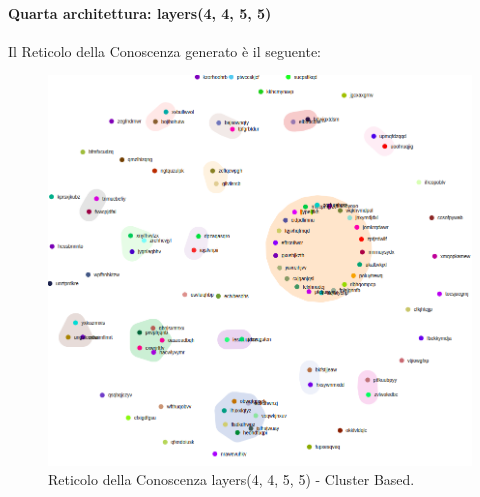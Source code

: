 \paragraph{Quarta architettura: layers(4, 4, 5, 5)}\mbox{}
\label{Quarta architettura}
\noindent
Il Reticolo della Conoscenza generato è il seguente:
\begin{figure}[H]
\centering
	\includegraphics[width=0.70\linewidth]{./image/logica(4,4,5,5).png}
	\caption{Reticolo della Conoscenza layers(4, 4, 5, 5) - Cluster Based.}
	\label{Reticolo della Conoscenza layers(4, 4, 5, 5) - Cluster Based.}
\end{figure}
\noindent

